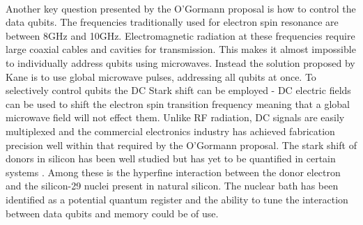 \\
Another key question presented by the O'Gormann proposal is how to control the data qubits.
The frequencies traditionally used for electron spin resonance are between 8GHz and 10GHz. 
Electromagnetic radiation at these frequencies require large coaxial cables and cavities for transmission. 
This makes it almost impossible to individually address qubits using microwaves. 
Instead the solution proposed by Kane is to use global microwave pulses, addressing all qubits at once.
To selectively control qubits the DC Stark shift can be employed - DC electric fields can be used to shift the electron spin transition frequency meaning that a global microwave field will not effect them. 
Unlike RF radiation, DC signals are easily multiplexed and the commercial electronics industry has achieved fabrication precision well within that required by the O'Gormann proposal.
The stark shift of donors in silicon has been well studied but has yet to be quantified in certain systems \cite{Pica2014}.
Among these is the hyperfine interaction between the donor electron and the silicon-29 nuclei present in natural silicon.
The nuclear bath has been identified as a potential quantum register and the ability to tune the interaction between data qubits and memory could be of use. 





